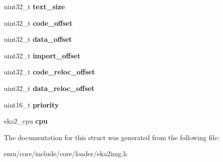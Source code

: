 \begin{DoxyCompactItemize}
uint32\+\_\+t {\bfseries text\+\_\+size}
\item 
\mbox{\label{structeka2l1_1_1loader_1_1eka2img__header_a98fb652512e17a43257ded430ad746e0}} 
uint32\+\_\+t {\bfseries code\+\_\+offset}
\item 
\mbox{\label{structeka2l1_1_1loader_1_1eka2img__header_a7afbbfb036d0e597d418100708449a02}} 
uint32\+\_\+t {\bfseries data\+\_\+offset}
\item 
\mbox{\label{structeka2l1_1_1loader_1_1eka2img__header_a8f7a48d2fc5323d5749a4d7e46d32a73}} 
uint32\+\_\+t {\bfseries import\+\_\+offset}
\item 
\mbox{\label{structeka2l1_1_1loader_1_1eka2img__header_af29a939df377a135385910b76edf73d9}} 
uint32\+\_\+t {\bfseries code\+\_\+reloc\+\_\+offset}
\item 
\mbox{\label{structeka2l1_1_1loader_1_1eka2img__header_aa9fb0cb152ed63f44c003e0f5d6484b0}} 
uint32\+\_\+t {\bfseries data\+\_\+reloc\+\_\+offset}
\item 
\mbox{\label{structeka2l1_1_1loader_1_1eka2img__header_ad2f1947d34e6fbed3c9de7131eacf738}} 
uint16\+\_\+t {\bfseries priority}
\item 
\mbox{\label{structeka2l1_1_1loader_1_1eka2img__header_a41d57050648f4dea761028b252a000a1}} 
eka2\+\_\+cpu {\bfseries cpu}
\end{DoxyCompactItemize}


The documentation for this struct was generated from the following file\+:\begin{DoxyCompactItemize}
\item 
emu/core/include/core/loader/eka2img.\+h\end{DoxyCompactItemize}
